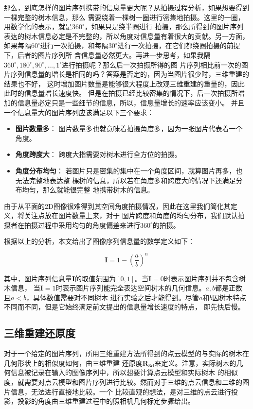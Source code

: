 那么，到底怎样的图片序列携带的信息量更大呢？从拍摄过程分析，如果想要得到一棵完整的树木信息，那么
需要绕着一棵树一圈进行密集地拍摄。这里的一圈，用数学化的表示，就是$360^\circ$，如果只是绕半圈进行
拍摄，那么所得到的图片序列表达的树木信息必定是不完整的，所以角度对信息量有着很大的贡献。另一方面，
如果每隔$60^\circ$进行一次拍摄，和每隔$30^\circ$进行一次拍摄，在它们都绕圈拍摄的前提下，后者的图片序列所
含信息量必然更大。再进一步思考，如果我隔$360^\circ,180^\circ,90^\circ,..., 1^\circ$进行拍摄呢？那么后一次拍摄所得的图
片序列相比前一次的图片序列信息量的增长是相同的吗？答案是否定的，因为当图片很少时，三维重建的结果也不好，
这时增加图片数量是能够很大程度上改观三维重建的重量的，因此此时的信息量增长速度快。
但是在拍摄已经比较密集的情况下，后一次拍摄所增加的信息量必定只是一些细节的信息，所以，信息量增长的速率应该变小。
并且一个信息量大的图片序列应该满足以下三个要求：\\
\begin{itemize}
	\item \textbf{图片数量多}： 图片数量多也就意味着拍摄角度多，因为一张图片代表着一个角度。
	\item \textbf{角度跨度大}： 跨度大指需要对树木进行全方位的拍摄。
	\item \textbf{角度分布均匀}： 若图片只是密集的集中在一个角度区间，就算图片再多，也无法完整地表达整
								  棵树的信息，所以若在角度多和跨度大的情况下还满足分布均匀，那么就能很完整
								  地携带树木的信息。
\end{itemize}

由于从平面的2D图像很难得到其空间角度拍摄情况，因此在这里我们简化其定义，将关注点放在图片数量上来，对于
图片跨度和角度的均匀分布，我们默认拍摄者在拍摄过程中采用均匀的角度偏差来进行$360^\circ$的拍摄。

根据以上的分析，本文给出了图像序列信息量的数学定义如下：\\
\begin{definition}
	\[ \mathbf{I}=1-(\frac{a}{b})^n \]
\end{definition}

其中，图片序列信息量$\mathbf{I}$的取值范围为$[0,1]$。当$\mathbf{I}=0$时表示图片序列并不包含树木信息，
当$\mathbf{I}=1$时表示图片序列能完全表达空间树木的几何信息。$a,b$都是正数且$a<b$，具体数值需要对不同树木
进行实验之后才能得到。尽管$a$和$b$因树木特点不同而不同，但是它始终满足前文提出的信息量增长速度的特点，
即先快后慢。

\subsection{三维重建还原度}
对于一个给定的图片序列，所用三维重建方法所得到的点云模型的与实际的树木在几何形状上的相似度如何，由三维重建
还原度$\mathbf{R_{3d}}$来定义。注意，实际树木的几何信息被记录在输入的图像序列中，所以想要计算点云模型和实际树木
的相似度，就需要对点云模型和图片序列进行比较。然而对于三维的点云信息和二维的图片信息，无法进行直接地比较。一个
比较直观的想法，是对三维的点云进行投影，投影的角度由三维重建过程中的照相机几何标定步骤给出。

